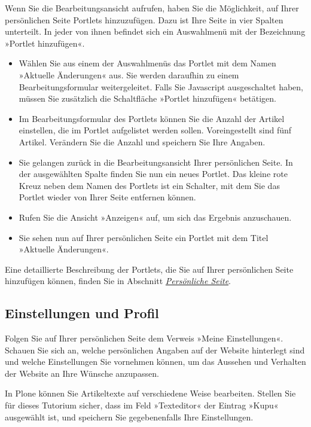 \documentclass[a4paper,12pt,ngerman]{manual}
\begin{document}
Wenn Sie die Bearbeitungsansicht aufrufen, haben Sie die Möglichkeit, auf
Ihrer persönlichen Seite Portlets hinzuzufügen. Dazu ist Ihre Seite in vier
Spalten unterteilt. In jeder von ihnen befindet sich ein Auswahlmenü mit der
Bezeichnung »Portlet hinzufügen«.
\begin{itemize}
\item {} 
Wählen Sie aus einem der Auswahlmenüs das Portlet mit dem Namen
»Aktuelle Änderungen« aus. Sie werden daraufhin zu einem Bearbeitungsformular
weitergeleitet. Falls Sie Javascript ausgeschaltet haben, müssen Sie
zusätzlich die Schaltfläche »Portlet hinzufügen« betätigen.

\item {} 
Im Bearbeitungsformular des Portlets können Sie die Anzahl der Artikel
einstellen, die im Portlet aufgelistet werden sollen. Voreingestellt sind
fünf Artikel. Verändern Sie die Anzahl und speichern Sie Ihre Angaben.

\item {} 
Sie gelangen zurück in die Bearbeitungsansicht Ihrer persönlichen Seite.
In der ausgewählten Spalte finden Sie nun ein neues Portlet. Das kleine rote
Kreuz neben dem Namen des Portlets ist ein Schalter, mit dem Sie das Portlet
wieder von Ihrer Seite entfernen können.

\item {} 
Rufen Sie die Ansicht »Anzeigen« auf, um sich das Ergebnis anzuschauen.

\item {} 
Sie sehen nun auf Ihrer persönlichen Seite ein Portlet mit dem Titel
»Aktuelle Änderungen«.

\end{itemize}

Eine detaillierte Beschreibung der Portlets, die Sie auf Ihrer persönlichen
Seite hinzufügen können, finden Sie in
Abschnitt \hyperlink{sec-personliche-seite-1}{\emph{Persönliche Seite}}.
\hypertarget{sec-tut-profil}{}

\subsection{Einstellungen und Profil}

Folgen Sie auf Ihrer persönlichen Seite dem Verweis
»Meine Einstellungen«. Schauen Sie sich an, welche persönlichen Angaben
auf der Website hinterlegt sind und welche Einstellungen Sie vornehmen können,
um das Aussehen und Verhalten der Website an Ihre Wünsche anzupassen.

In Plone können Sie Artikeltexte auf verschiedene Weise bearbeiten. Stellen
Sie für dieses Tutorium sicher, dass im Feld »Texteditor« der Eintrag »Kupu«
ausgewählt ist, und speichern Sie gegebenenfalls Ihre Einstellungen.
\end{document}

